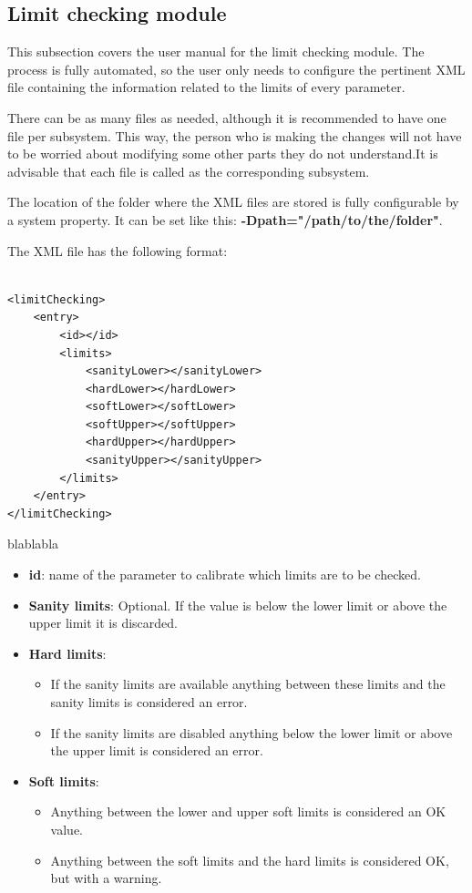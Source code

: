\subsection{Limit checking module}
This subsection covers the user manual for the limit checking module. The process is fully automated, so the user only needs to configure the pertinent XML file containing the information related to the limits of every parameter. 

There can be as many files as needed, although it is recommended to have one file per subsystem. This way, the person who is making the changes will not have to be worried about modifying some other parts they do not understand.It is advisable that each file is called as the corresponding subsystem.

The location of the folder where the XML files are stored is fully configurable by a system property. It can be set like this: \textbf{-Dpath="/path/to/the/folder"}.

The XML file has the following format:
\begin{table}[H]
\lstset{language=XML}
\begin{lstlisting}

<limitChecking>
	<entry>
		<id></id>
		<limits>
			<sanityLower></sanityLower>
			<hardLower></hardLower>
			<softLower></softLower>
			<softUpper></softUpper>
			<hardUpper></hardUpper>
			<sanityUpper></sanityUpper>
		</limits>
	</entry>
</limitChecking>
\end{lstlisting}
\caption{blablabla}
\label{Table5.5}
\end{table}

\begin{itemize}
\item \textbf{id}: name of the parameter to calibrate which limits are to be checked.
\item \textbf{Sanity limits}: Optional. If the value is below the lower limit or above the upper limit it is discarded. 
\item \textbf{Hard limits}:
	\begin{itemize}
	\item If the sanity limits are available anything between these limits and the sanity limits is considered an error.
	\item If the sanity limits are disabled anything below the lower limit or above the upper limit is considered an error. 
	\end{itemize}
\item \textbf{Soft limits}: 
\begin{itemize}
\item Anything between the lower and upper soft limits is considered an OK value.
\item Anything between the soft limits and the hard limits is considered OK, but with a warning.
\end{itemize}
\end{itemize}

